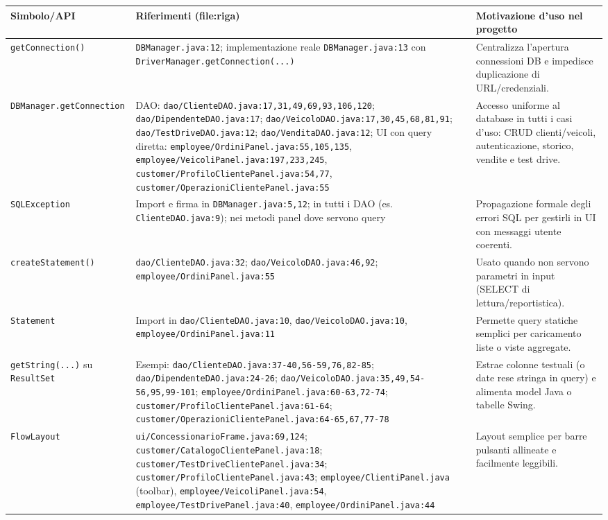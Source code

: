 \documentclass[12pt,a4paper]{article}
\begin{document}
\begin{longtable}{p{} p{} p{}}
\toprule
\textbf{Simbolo/API} & \textbf{Riferimenti (file:riga)} & \textbf{Motivazione d'uso nel progetto} \\
\midrule
\endhead
\texttt{getConnection()} & \texttt{DBManager.java:12}; implementazione reale \texttt{DBManager.java:13} con \texttt{DriverManager.getConnection(...)} & Centralizza l'apertura connessioni DB e impedisce duplicazione di URL/credenziali.
\\
\texttt{DBManager.getConnection} & DAO: \texttt{dao/ClienteDAO.java:17,31,49,69,93,106,120}; \texttt{dao/DipendenteDAO.java:17}; \texttt{dao/VeicoloDAO.java:17,30,45,68,81,91}; \texttt{dao/TestDriveDAO.java:12}; \texttt{dao/VenditaDAO.java:12}; UI con query diretta: \texttt{employee/OrdiniPanel.java:55,105,135}, \texttt{employee/VeicoliPanel.java:197,233,245}, \texttt{customer/ProfiloClientePanel.java:54,77}, \texttt{customer/OperazioniClientePanel.java:55} & Accesso uniforme al database in tutti i casi d'uso: CRUD clienti/veicoli, autenticazione, storico, vendite e test drive.
\\
\texttt{SQLException} & Import e firma in \texttt{DBManager.java:5,12}; in tutti i DAO (es. \texttt{ClienteDAO.java:9}); nei metodi panel dove servono query & Propagazione formale degli errori SQL per gestirli in UI con messaggi utente coerenti.
\\
\texttt{createStatement()} & \texttt{dao/ClienteDAO.java:32}; \texttt{dao/VeicoloDAO.java:46,92}; \texttt{employee/OrdiniPanel.java:55} & Usato quando non servono parametri in input (SELECT di lettura/reportistica).
\\
\texttt{Statement} & Import in \texttt{dao/ClienteDAO.java:10}, \texttt{dao/VeicoloDAO.java:10}, \texttt{employee/OrdiniPanel.java:11} & Permette query statiche semplici per caricamento liste o viste aggregate.
\\
\texttt{getString(...)} su \texttt{ResultSet} & Esempi: \texttt{dao/ClienteDAO.java:37-40,56-59,76,82-85}; \texttt{dao/DipendenteDAO.java:24-26}; \texttt{dao/VeicoloDAO.java:35,49,54-56,95,99-101}; \texttt{employee/OrdiniPanel.java:60-63,72-74}; \texttt{customer/ProfiloClientePanel.java:61-64}; \texttt{customer/OperazioniClientePanel.java:64-65,67,77-78} & Estrae colonne testuali (o date rese stringa in query) e alimenta model Java o tabelle Swing.
\\
\texttt{FlowLayout} & \texttt{ui/ConcessionarioFrame.java:69,124}; \texttt{customer/CatalogoClientePanel.java:18}; \texttt{customer/TestDriveClientePanel.java:34}; \texttt{customer/ProfiloClientePanel.java:43}; \texttt{employee/ClientiPanel.java} (toolbar), \texttt{employee/VeicoliPanel.java:54}, \texttt{employee/TestDrivePanel.java:40}, \texttt{employee/OrdiniPanel.java:44} & Layout semplice per barre pulsanti allineate e facilmente leggibili.

\end{longtable}
\end{document}
